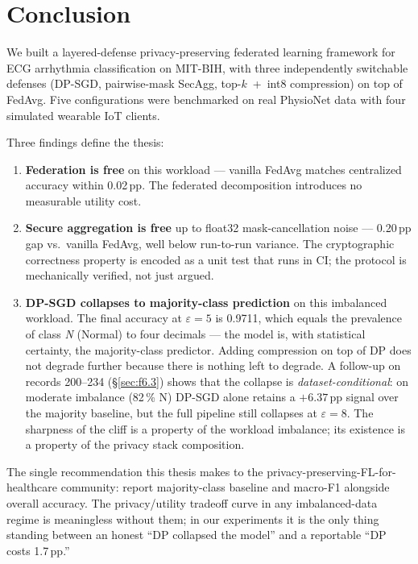 \documentclass[11pt,a4paper]{report}
\begin{document}
\chapter{Conclusion}\label{ch:concl}

We built a layered-defense privacy-preserving federated learning framework for
ECG arrhythmia classification on MIT-BIH, with three independently switchable
defenses (DP-SGD, pairwise-mask SecAgg, top-$k$~+~int8 compression) on top of
FedAvg. Five configurations were benchmarked on real PhysioNet data with four
simulated wearable IoT clients.

Three findings define the thesis:

\begin{enumerate}[leftmargin=*]
  \item \textbf{Federation is free} on this workload --- vanilla FedAvg
  matches centralized accuracy within 0.02\,pp. The federated decomposition
  introduces no measurable utility cost.
  \item \textbf{Secure aggregation is free} up to float32 mask-cancellation
  noise --- 0.20\,pp gap vs.\ vanilla FedAvg, well below run-to-run
  variance. The cryptographic correctness property is encoded as a unit test
  that runs in CI; the protocol is mechanically verified, not just argued.
  \item \textbf{DP-SGD collapses to majority-class prediction} on this
  imbalanced workload. The final accuracy at $\varepsilon = 5$ is 0.9711,
  which equals the prevalence of class \emph{N} (Normal) to four decimals
  --- the model is, with statistical certainty, the majority-class
  predictor. Adding compression on top of DP does not degrade further
  because there is nothing left to degrade. A follow-up on records
  200--234 (\S\ref{sec:f6.3}) shows that the collapse is
  \emph{dataset-conditional}: on moderate imbalance (82\,\% N) DP-SGD
  alone retains a $+6.37$\,pp signal over the majority baseline, but
  the full pipeline still collapses at $\varepsilon = 8$. The
  sharpness of the cliff is a property of the workload imbalance; its
  existence is a property of the privacy stack composition.
\end{enumerate}

The single recommendation this thesis makes to the
privacy-preserving-FL-for-healthcare community: report majority-class
baseline and macro-F1 alongside overall accuracy. The privacy/utility
tradeoff curve in any imbalanced-data regime is meaningless without them;
in our experiments it is the only thing standing between an honest
``DP collapsed the model'' and a reportable ``DP costs 1.7\,pp.''
\end{document}
